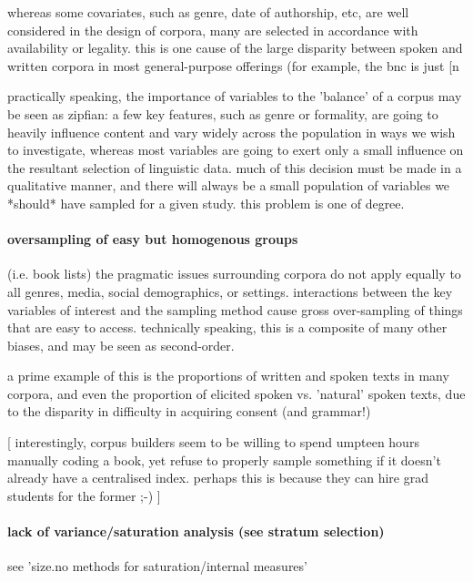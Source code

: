 whereas some covariates, such as genre, date of authorship, etc, are well considered in the design of corpora, many are selected in accordance with availability or legality.  this is one cause of the large disparity between spoken and written corpora in most general-purpose offerings (for example, the bnc is just [n%

practically speaking, the importance of variables to the 'balance' of a corpus may be seen as zipfian: a few key features, such as genre or formality, are going to heavily influence content and vary widely across the population in ways we wish to investigate, whereas most variables are going to exert only a small influence on the resultant selection of linguistic data.  much of this decision must be made in a qualitative manner, and there will always be a small population of variables we *should* have sampled for a given study.  this problem is one of degree.



\paragraph{ oversampling of easy but homogenous groups }
(i.e. book lists)
the pragmatic issues surrounding corpora do not apply equally to all genres, media, social demographics, or settings.  interactions between the key variables of interest and the sampling method cause gross over-sampling of things that are easy to access.  technically speaking, this is a composite of many other biases, and may be seen as second-order.

a prime example of this is the proportions of written and spoken texts in many corpora, and even the proportion of elicited spoken vs. 'natural' spoken texts, due to the disparity in difficulty in acquiring consent (and grammar!)

[ interestingly, corpus builders seem to be willing to spend umpteen hours manually coding a book, yet refuse to properly sample something if it doesn't already have a centralised index.  perhaps this is because they can hire grad students for the former ;-) ]


\paragraph{ lack of variance/saturation analysis (see stratum selection)}
see 'size.no methods for saturation/internal measures'


